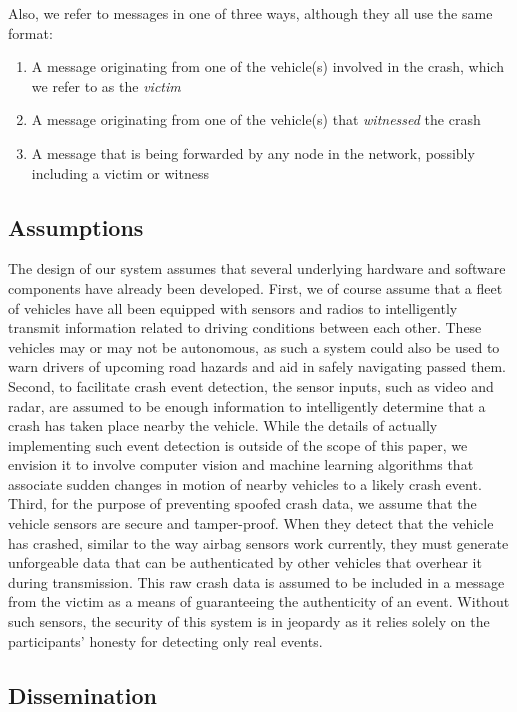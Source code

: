 \documentclass{IEEEtran}
\begin{document}
Also, we refer to messages in one of three ways, although they all use the same format:

\begin{enumerate}
  \item A message originating from one of the vehicle(s) involved in the crash, which we refer to as the \emph{victim}
  \item A message originating from one of the vehicle(s) that \emph{witnessed} the crash
  \item A message that is being forwarded by any node in the network, possibly including a victim or witness
\end{enumerate}


\subsection{Assumptions}

The design of our system assumes that several underlying hardware and software components have already been developed.
First, we of course assume that a fleet of vehicles have all been equipped with sensors and radios to intelligently transmit information related to driving conditions between each other.
These vehicles may or may not be autonomous, as such a system could also be used to warn drivers of upcoming road hazards and aid in safely navigating passed them.
Second, to facilitate crash event detection, the sensor inputs, such as video and radar, are assumed to be enough information to intelligently determine that a crash has taken place nearby the vehicle.
While the details of actually implementing such event detection is outside of the scope of this paper, we envision it to involve computer vision and machine learning algorithms that associate sudden changes in motion of nearby vehicles to a likely crash event.
Third, for the purpose of preventing spoofed crash data, we assume that the vehicle sensors are secure and tamper-proof.
When they detect that the vehicle has crashed, similar to the way airbag sensors work currently, they must generate unforgeable data that can be authenticated by other vehicles that overhear it during transmission.
This raw crash data is assumed to be included in a message from the victim as a means of guaranteeing the authenticity of an event.
Without such sensors, the security of this system is in jeopardy as it relies solely on the participants' honesty for detecting only real events.

\subsection{Dissemination}
\end{document}
